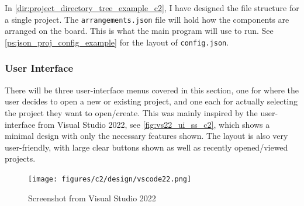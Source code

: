 \documentclass[11pt]{article}
\begin{document}
                In \autoref{dir:project_directory_tree_example_c2}, I have designed the file structure for a single project. 
                The \verb|arrangements.json| file will hold how the components are arranged on the board. This is what the main program will use to run. 
                See \autoref{ps:json_proj_config_example} for the layout of \verb|config.json|.


            \subsubsection{User Interface} 


                

                There will be three user-interface menus covered in this section, one for where the user decides to open a new or existing project, and one each for actually selecting the project they want to open/create. 
                This was mainly inspired by the user-interface from Visual Studio 2022, see \autoref{fig:vs22_ui_ss_c2}, which shows a minimal design with only the necessary features shown.
                The layout is also very user-friendly, with large clear buttons shown as well as recently opened/viewed projects.

                \begin{figure}[!ht]
                    \centering
                    \texttt{[image: figures/c2/design/vscode22.png]}
                    \caption{Screenshot from Visual Studio 2022}
                    \label{fig:vs22_ui_ss_c2}
                \end{figure}
\end{document}
